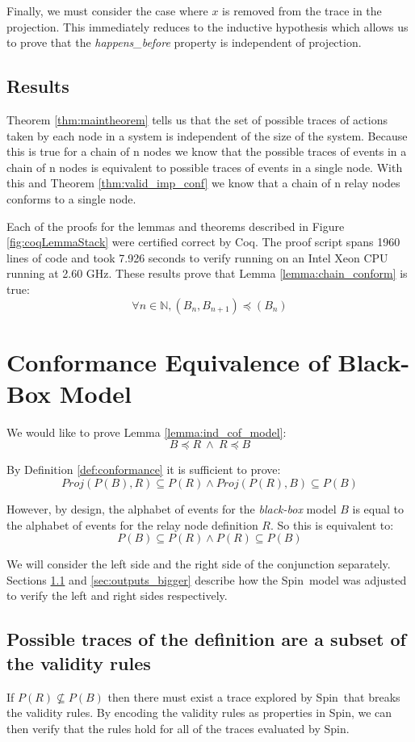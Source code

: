 \documentclass[runningheads]{llncs}
\newcommand{\projalpha}[2]{\mathit{Proj}(#1, #2)}
\newcommand{\figref}[1]{Figure \ref{#1}}
\newcommand{\spin}{Spin}
\begin{document}
Finally, we must consider the case where $x$ is removed from the trace in the projection. This immediately reduces to the inductive hypothesis which allows us to prove that the \emph{happens\_before} property is independent of projection.

\subsection{Results}
Theorem \ref{thm:maintheorem} tells us that the set of possible traces of actions taken by each node in a system is independent of the size of the system. Because this is true for a chain of n nodes we know that the possible traces of events in a chain of n nodes is equivalent to possible traces of events in a single node. With this and Theorem \ref{thm:valid_imp_conf} we know that a chain of n relay nodes conforms to a single node. 

Each of the proofs for the lemmas and theorems described in \figref{fig:coqLemmaStack} were certified correct by Coq. The proof script spans 1960 lines of code and took 7.926 seconds to verify running on an Intel Xeon CPU running at 2.60 GHz.
These results prove that Lemma \ref{lemma:chain_conform} is true:
$$\forall n \in \mathds{N}, (B_n, B_{n+1}) \preceq (B_n)
$$


\section{Conformance Equivalence of Black-Box Model}
\label{sec:inputs_map}
We would like to prove Lemma \ref{lemma:ind_cof_model}:
$$B \preceq R\ 
\wedge\ 
R \preceq B$$

By Definition \ref{def:conformance} it is sufficient to prove:
$$\projalpha{P(B)}{R} \subseteq P(R) \wedge \projalpha{P(R)}{B} \subseteq P(B)$$

However, by design, the alphabet of events for the \emph{black-box} model $B$ is equal to the alphabet of events for the relay node definition $R$. So this is equivalent to:
$$P(B) \subseteq P(R) \wedge P(R) \subseteq P(B)$$

We will consider the left side and the right side of the conjunction separately. 
Sections \ref{sec:inputs_smaller} and \ref{sec:outputs_bigger} describe how the \spin\ model was adjusted to verify the left and right sides respectively.

\subsection{Possible traces of the definition are a subset of the validity rules}
\label{sec:inputs_smaller}
If $P(R) \nsubseteq P(B)$ then there must exist a trace explored by \spin\ that breaks the validity rules. By encoding the validity rules as properties in \spin, we can then verify that the rules hold for all of the traces evaluated by \spin. 
\end{document}
